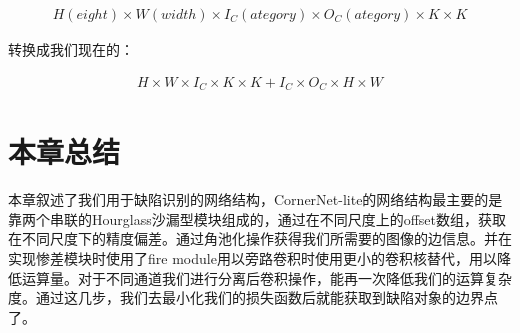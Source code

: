 \begin{eqnarray}
    H(eight) \times W(width) \times I_C(ategory) \times O_C(ategory) \times K \times K
\end{eqnarray}

转换成我们现在的：

\begin{eqnarray}
    H \times W \times I_C \times K \times K + I_C \times O_C \times H \times W
\end{eqnarray}

\section{本章总结}

本章叙述了我们用于缺陷识别的网络结构，CornerNet-lite的网络结构最主要的是靠两个串联的Hourglass沙漏型模块组成的，通过在不同尺度上的offset数组，获取在不同尺度下的精度偏差。通过角池化操作获得我们所需要的图像的边信息。并在实现惨差模块时使用了fire module用以旁路卷积时使用更小的卷积核替代，用以降低运算量。对于不同通道我们进行分离后卷积操作，能再一次降低我们的运算复杂度。通过这几步，我们去最小化我们的损失函数后就能获取到缺陷对象的边界点了。